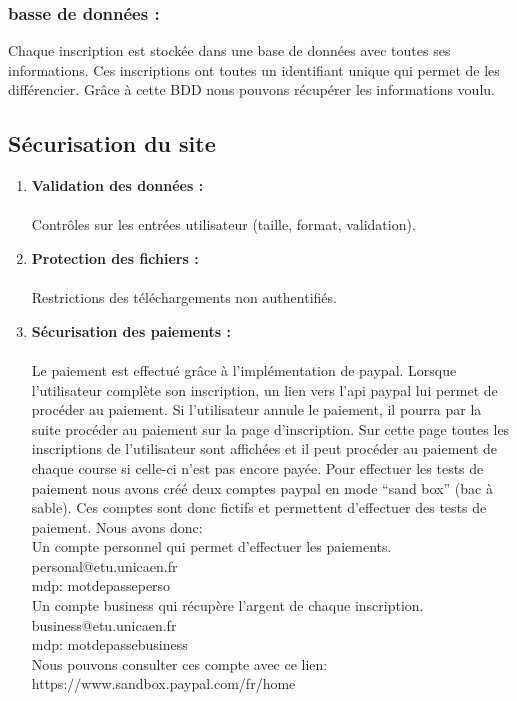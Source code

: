 \documentclass[12pt]{article} %
\begin{document}
        \subsubsection{ basse de données :}
            Chaque inscription est stockée dans une base de données avec toutes ses informations. Ces inscriptions ont toutes un identifiant unique qui permet de les différencier. Grâce à cette BDD nous pouvons récupérer les informations voulu.


		
		
	\subsection{Sécurisation du site}
        \begin{enumerate}
            \item \textbf{Validation des données :}\\ \\
                Contrôles sur les entrées utilisateur (taille, format, validation).
            \item \textbf{Protection des fichiers :}\\ \\
                Restrictions des téléchargements non authentifiés.
            \item \textbf{Sécurisation des paiements :}\\ \\
                Le paiement est effectué grâce à l'implémentation de paypal. Lorsque l'utilisateur complète son inscription, un lien vers l’api paypal lui permet de procéder au paiement. Si l'utilisateur annule le paiement, il pourra par la suite procéder au paiement sur la page d’inscription. Sur cette page toutes les inscriptions de l'utilisateur sont affichées et il peut procéder au paiement de chaque course si celle-ci n'est pas encore payée. Pour effectuer les tests de paiement nous avons créé deux comptes paypal en mode “sand box” (bac à sable). Ces comptes sont donc fictifs et permettent d'effectuer des tests de paiement. Nous avons donc:\\
                Un compte personnel qui permet d'effectuer les paiements.\\
                personal@etu.unicaen.fr\\
                mdp: motdepasseperso\\
                Un compte business qui récupère l’argent de chaque inscription.\\
                business@etu.unicaen.fr\\
                mdp: motdepassebusiness\\
                Nous pouvons consulter ces compte avec ce lien:\\  https://www.sandbox.paypal.com/fr/home\\

        \end{enumerate}
\end{document}
